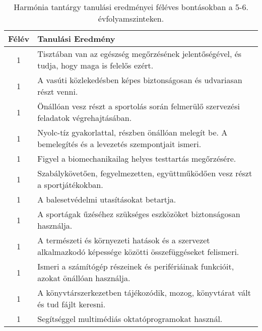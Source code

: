        
           \begin{longtable}{c | p{12cm} }
            \caption[Harmónia 5-6.]{Harmónia tantárgy tanulási eredményei féléves bontásokban a 5-6. évfolyamszinteken. }  \\

            \textbf{Félév} & \textbf{Tanulási Eredmény} \\
            \hline
            \endhead
                                
                                      
                                
                                          1 &  Tisztában van az egészség megőrzésének jelentőségével, és tudja, hogy maga is felelős ezért. \\ \hline
                                          1 &  A vasúti közlekedésben képes biztonságosan és udvariasan részt venni. \\ \hline
                                          1 &  Önállóan vesz részt a sportolás során felmerülő szervezési feladatok végrehajtásában. \\ \hline
                                          1 &  Nyolc-tíz gyakorlattal, részben önállóan melegít be. A bemelegítés és a levezetés szempontjait ismeri. \\ \hline
                                          1 &  Figyel a biomechanikailag helyes testtartás megőrzésére. \\ \hline
                                          1 &  Szabálykövetően, fegyelmezetten, együttműködően vesz részt a sportjátékokban. \\ \hline
                                          1 &  A balesetvédelmi utasításokat betartja. \\ \hline
                                          1 &  A sportágak űzéséhez szükséges eszközöket biztonságosan használja. \\ \hline
                                          1 &  A természeti és környezeti hatások és a szervezet alkalmazkodó képessége közötti összefüggéseket felismeri. \\ \hline
                                          1 &  Ismeri a számítógép részeinek és perifériáinak funkcióit, azokat önállóan használja. \\ \hline
                                          1 &  A könyvtárszerkezetben tájékozódik, mozog, könyvtárat vált és tud fájlt keresni. \\ \hline
                                          1 &  Segítséggel multimédiás oktatóprogramokat használ. \\ \hline

\end{longtable}
